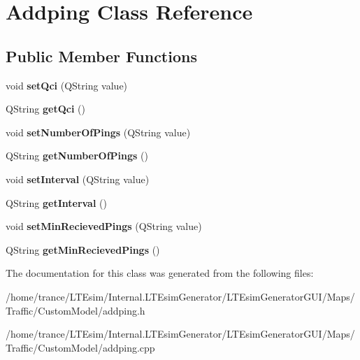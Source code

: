 \hypertarget{class_addping}{}\section{Addping Class Reference}
\label{class_addping}
\subsection*{Public Member Functions}
\begin{DoxyCompactItemize}
\item 
void {\bfseries set\+Qci} (Q\+String value)\hypertarget{class_addping_ae67680c8f4ceb435dd83cbc887daed45}{}\label{class_addping_ae67680c8f4ceb435dd83cbc887daed45}

\item 
Q\+String {\bfseries get\+Qci} ()\hypertarget{class_addping_af086526de78bc784750135a8ec9ec85d}{}\label{class_addping_af086526de78bc784750135a8ec9ec85d}

\item 
void {\bfseries set\+Number\+Of\+Pings} (Q\+String value)\hypertarget{class_addping_a33dc2e415015e2d04c59e1e522f5eaf9}{}\label{class_addping_a33dc2e415015e2d04c59e1e522f5eaf9}

\item 
Q\+String {\bfseries get\+Number\+Of\+Pings} ()\hypertarget{class_addping_ad1d6a06520a054c64d1926e68d53c355}{}\label{class_addping_ad1d6a06520a054c64d1926e68d53c355}

\item 
void {\bfseries set\+Interval} (Q\+String value)\hypertarget{class_addping_a2ac74755c1ce94dc50121f6fc05d002d}{}\label{class_addping_a2ac74755c1ce94dc50121f6fc05d002d}

\item 
Q\+String {\bfseries get\+Interval} ()\hypertarget{class_addping_ad1ee5a36b855da55214030165ea53490}{}\label{class_addping_ad1ee5a36b855da55214030165ea53490}

\item 
void {\bfseries set\+Min\+Recieved\+Pings} (Q\+String value)\hypertarget{class_addping_aabc3dcb39ff41baa794ef1eddf398dc5}{}\label{class_addping_aabc3dcb39ff41baa794ef1eddf398dc5}

\item 
Q\+String {\bfseries get\+Min\+Recieved\+Pings} ()\hypertarget{class_addping_a685a6c82bef32e4c6f9b15c8413710f0}{}\label{class_addping_a685a6c82bef32e4c6f9b15c8413710f0}

\end{DoxyCompactItemize}


The documentation for this class was generated from the following files\+:\begin{DoxyCompactItemize}
\item 
/home/trance/\+L\+T\+Esim/\+Internal.\+L\+T\+Esim\+Generator/\+L\+T\+Esim\+Generator\+G\+U\+I/\+Maps/\+Traffic/\+Custom\+Model/addping.\+h\item 
/home/trance/\+L\+T\+Esim/\+Internal.\+L\+T\+Esim\+Generator/\+L\+T\+Esim\+Generator\+G\+U\+I/\+Maps/\+Traffic/\+Custom\+Model/addping.\+cpp\end{DoxyCompactItemize}
